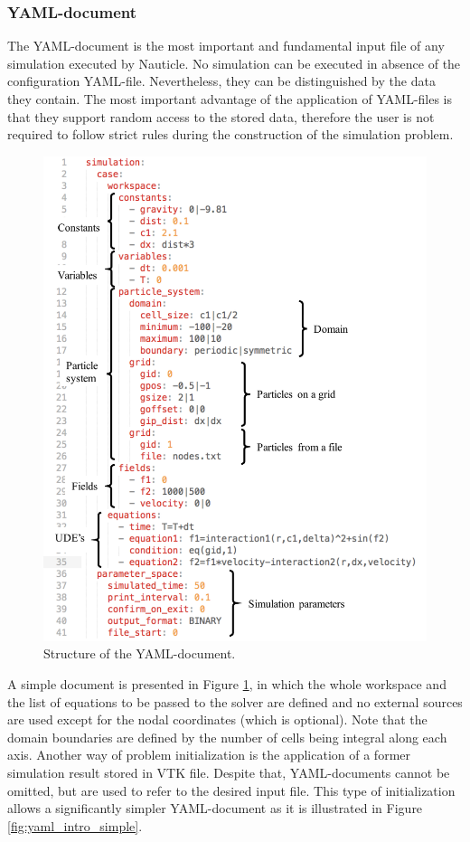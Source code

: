 \documentclass[a4paper,12pt,openany]{book}
\theoremstyle{break}
\begin{document}
\subsubsection{YAML-document} \label{sec:YAML}
The YAML-document is the most important and fundamental input file of any simulation executed by Nauticle. No simulation can be executed in absence of the configuration YAML-file. Nevertheless, they can be distinguished by the data they contain. The most important advantage of the application of YAML-files is that they support random access to the stored data, therefore the user is not required to follow strict rules during the construction of the simulation problem.\\
\begin{figure}[H]
  \includegraphics[scale=0.8]{yaml_intro.pdf}
  \centering
  \caption{Structure of the YAML-document.}
  \label{fig:yaml_intro}
\end{figure}\vspace*{3pt}
A simple document is presented in Figure \ref{fig:yaml_intro}, in which the whole workspace and the list of equations to be passed to the solver are defined and no external sources are used except for the nodal coordinates (which is optional). Note that the domain boundaries are defined by the number of cells being integral along each axis. Another way of problem initialization is the application of a former simulation result stored in VTK file. Despite that, YAML-documents cannot be omitted, but are used to refer to the desired input file. This type of initialization allows a significantly simpler YAML-document as it is illustrated in Figure \ref{fig:yaml_intro_simple}.
\end{document}

